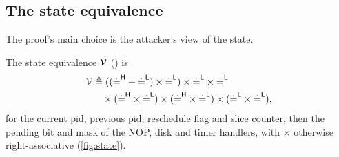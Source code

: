 

\subsection{The state equivalence}\label{sec:state-equiv}

The proof's main choice is the attacker's view of the state.

\begin{definition}\label{def:state}
The state equivalence $\mathcal{V}$ () is
\begin{align*}
\mathcal{V} &\triangleq (({\doteq^{\mathsf{H}}} + {\doteq^{\mathsf{L}}}) \times {\doteq^{\mathsf{L}}}) \times {\doteq^{\mathsf{L}}} \times {\doteq^{\mathsf{L}}} \\
&\quad{} \times ({\doteq^{\mathsf{H}}} \times {\doteq^{\mathsf{L}}}) \times ({\doteq^{\mathsf{H}}} \times {\doteq^{\mathsf{L}}}) \times ({\doteq^{\mathsf{L}}} \times {\doteq^{\mathsf{L}}}),
\end{align*}
for the current pid, previous pid, reschedule flag and slice counter, then the
pending bit and mask of the NOP, disk and timer handlers, with $\times$ otherwise
right-associative (\cref{fig:state}).
\end{definition}

